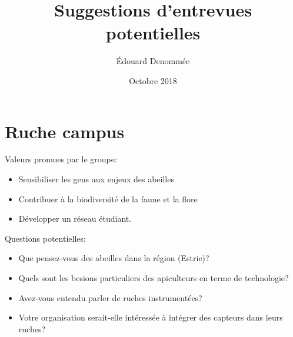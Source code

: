 \documentclass{article}
\title{Suggestions d'entrevues potentielles}
\author{Édouard Denommée}
\date{Octobre 2018}
\begin{document}
\maketitle

\section{Ruche campus}
Valeurs promues par le groupe:
\begin{itemize}
	\item Sensibiliser les gens aux enjeux des abeilles
	\item Contribuer à la biodiversité de la faune et la flore
	\item Développer un réseau étudiant.
\end{itemize}

\begin{flushleft}
Questions potentielles:
\begin{itemize}
	\item Que pensez-vous des abeilles dans la région (Estrie)?
	\item Quels sont les besions particuliers des apiculteurs en terme de technologie?
	\item Avez-vous entendu parler de ruches instrumentées?
	\item Votre organisation serait-elle intéressée à intégrer des capteurs dans leurs ruches?
\end{itemize}

\end{flushleft} 
\end{document}
